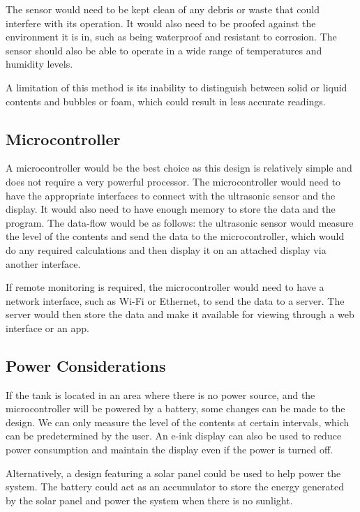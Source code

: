 \documentclass{article}
\begin{document}
The sensor would need to be kept clean of any debris or waste that could interfere with its operation. It would also need to be proofed against the environment it is in, such as being waterproof and resistant to corrosion. The sensor should also be able to operate in a wide range of temperatures and humidity levels.

A limitation of this method is its inability to distinguish between solid or liquid contents and bubbles or foam, which could result in less accurate readings.

\subsection{Microcontroller}
A microcontroller would be the best choice as this design is relatively simple and does not require a very powerful processor. The microcontroller would need to have the appropriate interfaces to connect with the ultrasonic sensor and the display. It would also need to have enough memory to store the data and the program. The data-flow would be as follows: the ultrasonic sensor would measure the level of the contents and send the data to the microcontroller, which would do any required calculations and then display it on an attached display via another interface.

If remote monitoring is required, the microcontroller would need to have a network interface, such as Wi-Fi or Ethernet, to send the data to a server. The server would then store the data and make it available for viewing through a web interface or an app.


\subsection{Power Considerations}
If the tank is located in an area where there is no power source, and the microcontroller will be powered by a battery, some changes can be made to the design. We can only measure the level of the contents at certain intervals, which can be predetermined by the user. An e-ink display can also be used to reduce power consumption and maintain the display even if the power is turned off.

Alternatively, a design featuring a solar panel could be used to help power the system. The battery could act as an accumulator to store the energy generated by the solar panel and power the system when there is no sunlight.
\end{document}
